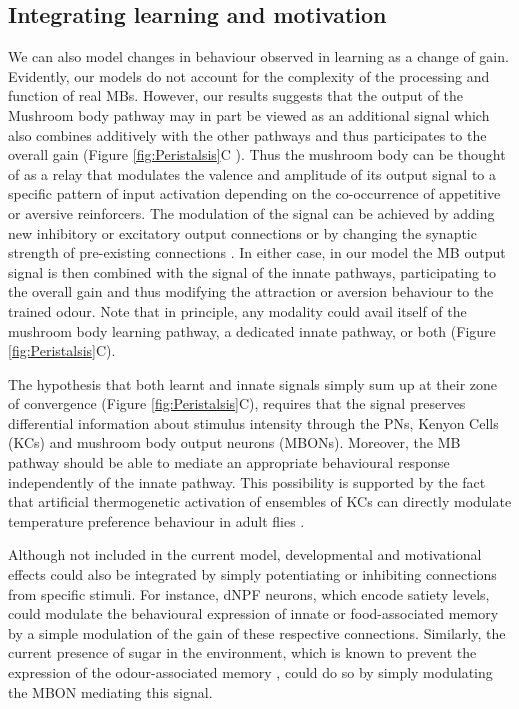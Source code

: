 \documentclass[11pt,a4paper]{article}
\newcommand{\todoBW}[1]{\todo[author=BW,color=orange, size=\tiny,inline]{#1}}
\begin{document}
\subsection{Integrating learning and motivation}

We can also model changes in behaviour observed in learning as a change of gain. Evidently, our models do not account for the complexity of the processing and function of real MBs. However, our results suggests that the output of the Mushroom body pathway \citep{gerber2004engram} may in part be viewed as an additional signal which also combines additively with the other pathways and thus participates to the overall gain (Figure \ref{fig:Peristalsis}C ). Thus the mushroom body can be thought of as a relay that modulates the valence and amplitude of its output signal to a specific pattern of input activation depending on the co-occurrence of appetitive or aversive reinforcers. The modulation of the signal can be achieved by adding new inhibitory or excitatory output connections or by changing the synaptic strength of pre-existing connections \citep{aso2014neuronal}. In either case, in our model the MB output signal is then combined with the signal of the innate pathways, participating to the overall gain and thus modifying the attraction or aversion behaviour to the trained odour.
 Note that in principle, any modality could avail itself of the mushroom body learning pathway, a dedicated innate pathway, or both (Figure \ref{fig:Peristalsis}C). 

The hypothesis that both learnt and innate signals simply sum up at their zone of convergence (Figure \ref{fig:Peristalsis}C), requires that the signal preserves differential information about stimulus intensity through the PNs, Kenyon Cells (KCs) and mushroom body output neurons (MBONs). Moreover, the MB pathway should be able to mediate an appropriate behavioural response independently of the innate pathway. This possibility is supported by the fact that artificial thermogenetic activation of ensembles of KCs can directly modulate temperature preference behaviour in adult flies \citep{vasmer2014induction}. 

Although not included in the current model, developmental \citep{gong2010two,wu2003developmental} and motivational \citep{krashes2009neural} %
 effects could also be integrated by simply potentiating or inhibiting connections from specific stimuli. For instance, dNPF neurons, which encode satiety levels, could modulate the behavioural expression of innate or food-associated memory \citep{krashes2009neural}  by a simple modulation of the gain of these respective connections. Similarly, the current presence of sugar in the environment, which is known to prevent the expression of the odour-associated memory \citep{schleyer2011behavior}, could do so by simply modulating the MBON mediating this signal. 
\end{document}
